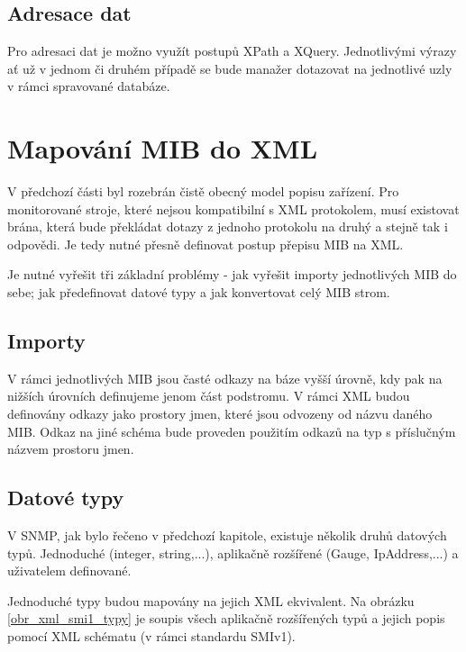 \subsection{Adresace dat}
Pro adresaci dat je možno využít postupů XPath a XQuery. Jednotlivými výrazy ať už v jednom či druhém případě se bude manažer dotazovat na jednotlivé uzly v
rámci spravované databáze.


\section{Mapování MIB do XML}
V předchozí části byl rozebrán čistě obecný model popisu zařízení. Pro monitorované stroje, které nejsou kompatibilní s XML protokolem, musí existovat brána,
která bude překládat dotazy z jednoho protokolu na druhý a stejně tak i odpovědi. Je tedy nutné přesně definovat postup přepisu MIB na XML.

Je nutné vyřešit tři základní problémy - jak vyřešit importy jednotlivých MIB do sebe; jak předefinovat datové typy a jak konvertovat celý MIB strom.

\subsection{Importy}
V rámci jednotlivých MIB jsou časté odkazy na báze vyšší úrovně, kdy pak na nižších úrovních definujeme jenom část podstromu. V rámci XML budou definovány 
odkazy jako prostory jmen, které jsou odvozeny od názvu daného MIB. Odkaz na jiné schéma bude proveden použitím odkazů na typ s příslučným názvem prostoru jmen. 

\subsection{Datové typy}
V SNMP, jak bylo řečeno v předchozí kapitole, existuje několik druhů datových typů. Jednoduché (integer, string,...), aplikačně rozšířené (Gauge, IpAddress,...) a 
uživatelem definované.

Jednoduché typy budou mapovány na jejich XML ekvivalent. Na obrázku \ref{obr_xml_smi1_typy} je soupis všech aplikačně rozšířených typů a jejich popis
pomocí XML schématu (v rámci standardu SMIv1).

